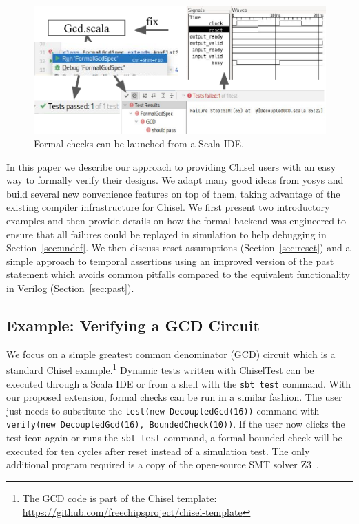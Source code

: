 \documentclass[conference]{IEEEtran}
\newcommand{\code}[1]{{\small{\texttt{#1}}}}
\begin{document}
\begin{figure}
\centering
\includegraphics{woset_formal_ide_flow.pdf}
\caption{Formal checks can be launched from a Scala IDE.}
\label{fig:ide-flow}
\end{figure}

In this paper we describe our approach to providing Chisel users with an easy way to formally verify their designs.
We adapt many good ideas from yosys and build several new convenience features on top of them, taking advantage
of the existing compiler infrastructure for Chisel.
We first present two introductory examples and then provide details on how the formal backend was engineered to ensure that
all failures could be replayed in simulation to help debugging in Section~\ref{sec:undef}.
We then discuss reset assumptions (Section~\ref{sec:reset}) and a simple approach to temporal assertions using an improved version of the
past statement which avoids common pitfalls compared to the equivalent functionality in Verilog (Section~\ref{sec:past}).


\subsection{Example: Verifying a GCD Circuit}

We focus on a simple greatest common denominator (GCD) circuit which is a standard Chisel example.\footnote{The GCD code is part of the Chisel template: \url{https://github.com/freechipsproject/chisel-template}}
Dynamic tests written with ChiselTest can be executed through a Scala IDE or from a shell with the \code{sbt test} command.
With our proposed extension, formal checks can be run in a similar fashion.
The user just needs to substitute the \code{test(new DecoupledGcd(16))}
command with \code{verify(new DecoupledGcd(16), BoundedCheck(10))}.
If the user now clicks the test icon again or runs the \code{sbt test} command, a formal bounded check will
be executed for ten cycles after reset instead of a simulation test.
The only additional program required is a copy of the open-source SMT solver Z3~\cite{de2008z3}.
\end{document}
